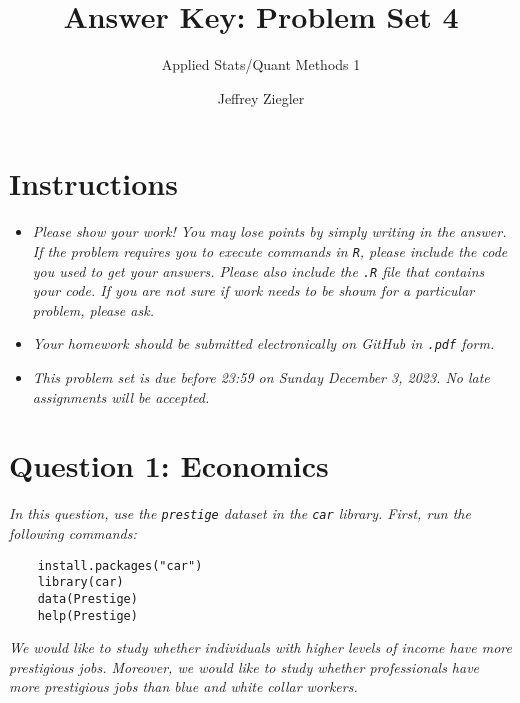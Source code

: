 \documentclass[12pt,letterpaper]{article}
\title{Answer Key: Problem Set 4}
\date{Jeffrey Ziegler}
\author{Applied Stats/Quant Methods 1}
\begin{document}
	\maketitle
	
	\section*{Instructions}
	\begin{itemize}
		\item \textit{Please show your work! You may lose points by simply writing in the answer. If the problem requires you to execute commands in \texttt{R}, please include the code you used to get your answers. Please also include the \texttt{.R} file that contains your code. If you are not sure if work needs to be shown for a particular problem, please ask.}
	\item \textit{Your homework should be submitted electronically on GitHub in \texttt{.pdf} form.}
	\item \textit{This problem set is due before 23:59 on Sunday December 3, 2023. No late assignments will be accepted.}
	\end{itemize}
		\vspace{.5cm}
	\section*{Question 1: Economics}
	\vspace{.25cm}
	\noindent 	\textit{In this question, use the \texttt{prestige} dataset in the \texttt{car} library. First, run the following commands:}
	
	\begin{verbatim}
	install.packages("car")
	library(car)
	data(Prestige)
	help(Prestige)
	\end{verbatim} 
	
	
	\noindent \textit{We would like to study whether individuals with higher levels of income have more prestigious jobs. Moreover, we would like to study whether professionals have more prestigious jobs than blue and white collar workers.}
	
\end{document}
